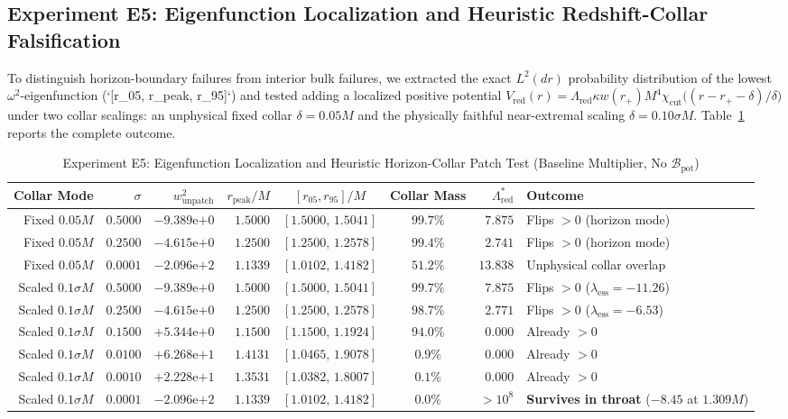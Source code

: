 \documentclass[11pt, a4paper]{article}
\theoremstyle{remark}
\begin{document}
\subsection{Experiment E5: Eigenfunction Localization and Heuristic Redshift-Collar Falsification}

To distinguish horizon-boundary failures from interior bulk failures, we extracted the exact $L^2(dr)$ probability distribution of the lowest $\omega^2$-eigenfunction (`[r_05, r_peak, r_95]`) and tested adding a localized positive potential $V_{\mathrm{red}}(r) = \Lambda_{\mathrm{red}}\kappa w(r_+)M^4\chi_{\mathrm{cut}}\big((r - r_+ - \delta)/\delta\big)$ under two collar scalings: an unphysical fixed collar $\delta = 0.05M$ and the physically faithful near-extremal scaling $\delta = 0.10\sigma M$. Table~\ref{tab:redshift-test} reports the complete outcome.

\begin{table}[h]
\centering
\caption{Experiment E5: Eigenfunction Localization and Heuristic Horizon-Collar Patch Test (Baseline Multiplier, No $\mathcal{B}_{\mathrm{pot}}$)}
\label{tab:redshift-test}
\small
\begin{tabular}{@{}rrrrccrl@{}}
\toprule
Collar Mode & $\sigma$ & $w^2_{\mathrm{unpatch}}$ & $r_{\mathrm{peak}}/M$ & $[r_{05}, r_{95}]/M$ & Collar Mass & $\Lambda_{\mathrm{red}}^*$ & Outcome \\
\midrule
Fixed $0.05M$ & $0.5000$ & $-9.389\mathrm{e}{+0}$ & $1.5000$ & $[1.5000,\, 1.5041]$ & $99.7\%$ & $7.875$ & Flips $>0$ (horizon mode) \\
Fixed $0.05M$ & $0.2500$ & $-4.615\mathrm{e}{+0}$ & $1.2500$ & $[1.2500,\, 1.2578]$ & $99.4\%$ & $2.741$ & Flips $>0$ (horizon mode) \\
Fixed $0.05M$ & $0.0001$ & $-2.096\mathrm{e}{+2}$ & $1.1339$ & $[1.0102,\, 1.4182]$ & $51.2\%$ & $13.838$ & Unphysical collar overlap \\
\midrule
Scaled $0.1\sigma M$ & $0.5000$ & $-9.389\mathrm{e}{+0}$ & $1.5000$ & $[1.5000,\, 1.5041]$ & $99.7\%$ & $7.875$ & Flips $>0$ ($\lambda_{\mathrm{ess}} = -11.26$) \\
Scaled $0.1\sigma M$ & $0.2500$ & $-4.615\mathrm{e}{+0}$ & $1.2500$ & $[1.2500,\, 1.2578]$ & $98.7\%$ & $2.771$ & Flips $>0$ ($\lambda_{\mathrm{ess}} = -6.53$) \\
Scaled $0.1\sigma M$ & $0.1500$ & $+5.344\mathrm{e}{+0}$ & $1.1500$ & $[1.1500,\, 1.1924]$ & $94.0\%$ & $0.000$ & Already $>0$ \\
Scaled $0.1\sigma M$ & $0.0100$ & $+6.268\mathrm{e}{+1}$ & $1.4131$ & $[1.0465,\, 1.9078]$ & $0.9\%$ & $0.000$ & Already $>0$ \\
Scaled $0.1\sigma M$ & $0.0010$ & $+2.228\mathrm{e}{+1}$ & $1.3531$ & $[1.0382,\, 1.8007]$ & $0.1\%$ & $0.000$ & Already $>0$ \\
Scaled $0.1\sigma M$ & $0.0001$ & $-2.096\mathrm{e}{+2}$ & $1.1339$ & $[1.0102,\, 1.4182]$ & $0.0\%$ & $>10^8$ & \textbf{Survives in throat} ($-8.45$ at $1.309M$) \\
\bottomrule
\end{tabular}
\end{table}
\end{document}
